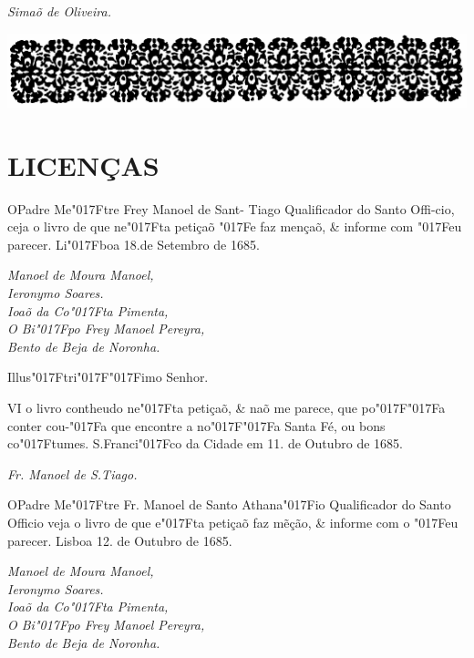 \documentclass[openany,titlepage,12pt]{book}
\renewcommand{\chaptermark}[1]{\markboth{#1}{}}
\renewcommand{\sectionmark}[1]{\gdef\rightmark{#1}}
\newcommand{\lgS}{\char"017F}
\newcommand{\lgSS}{\char"017F\char"017F}
\begin{document}
\begin{center}
    \hspace{60pt}\textit{Simaõ de Oliveira.}
\end{center}
\newpage

\begin{center}
    \includegraphics[scale=0.33]{06.licencas.png}
\end{center}
\unskip
\vspace*{-20pt}
{\let\clearpage\relax \chapter{LICENÇAS}}
\chaptermark{Licenças.}
\sectionmark{Licenças.}

\lettrine[findent=2pt, nindent=0pt, lines=2]
{O}{}Padre Me\lgS tre Frey Manoel de Sant-\linebreak 
Tiago Qualificador do Santo Offi-\linebreak cio,
ceja o livro de que ne\lgS ta petiçaõ \lgS e faz
mençaõ, \& informe com \lgS eu parecer. Li\lgS boa 18.de Setembro
de 1685.
\unskip
\begin{adjustwidth}{30pt}{0pt}
    \textit{Manoel de Moura Manoel,\\
    Ieronymo Soares.\\
    Ioaõ da Co\lgS ta Pimenta,\\
    O Bi\lgS po Frey Manoel Pereyra,\\
    Bento de Beja de Noronha.}
\end{adjustwidth}

\begin{center}
    Illus\lgS tri\lgSS imo Senhor.
\end{center}

\lettrine[findent=2pt, nindent=0pt, lines=2]
{V}{I} o livro contheudo ne\lgS ta petiçaõ, \& naõ me parece, que
po\lgSS a conter cou-\lgS a que encontre a no\lgSS a Santa Fé, ou
bons co\lgS tumes. S.Franci\lgS co da Cidade em 11. de Outubro de
 1685.

 \begin{center}
    \hspace{60pt}\textit{Fr. Manoel de S.Tiago.}
\end{center}
\newpage

\lettrine[findent=2pt, nindent=0pt, lines=2]
{O}{}Padre Me\lgS tre Fr. Manoel de Santo\linebreak
 Athana\lgS io Qualificador
do Santo Officio veja o livro de que e\lgS ta petiçaõ faz mẽção, \&
informe com o \lgS eu parecer. Lisboa 12. de Outubro de 1685.
\unskip
\begin{adjustwidth}{30pt}{0pt}
    \textit{Manoel de Moura Manoel,\\
    Ieronymo Soares.\\
    Ioaõ da Co\lgS ta Pimenta,\\
    O Bi\lgS po Frey Manoel Pereyra,\\
    Bento de Beja de Noronha.}
\end{adjustwidth}
\end{document}
